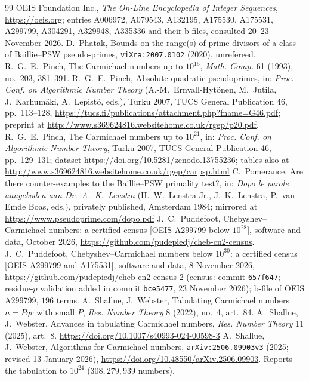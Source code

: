\documentclass[11pt]{amsart}
\theoremstyle{definition}
\theoremstyle{remark}
\begin{document}
\begin{thebibliography}{99}
 OEIS Foundation Inc., \emph{The On-Line Encyclopedia of Integer Sequences}, \url{https://oeis.org}; entries A006972, A079543, A132195, A175530, A175531, A299799, A304291, A329948, A335336 and their b-files, consulted 20--23 November 2026.
 D.~Phatak, Bounds on the range(s) of prime divisors of a class of Baillie--PSW pseudo-primes, \texttt{viXra:2007.0102} (2020), unrefereed.
 R.~G.~E.~Pinch, The Carmichael numbers up to $10^{15}$, \emph{Math. Comp.} 61 (1993), no.~203, 381--391.
 R.~G.~E.~Pinch, Absolute quadratic pseudoprimes, in: \emph{Proc. Conf. on Algorithmic Number Theory} (A.-M.~Ernvall-Hyt\"onen, M.~Jutila, J.~Karhum\"aki, A.~Lepist\"o, eds.), Turku 2007, TUCS General Publication 46, pp.~113--128, \url{https://tucs.fi/publications/attachment.php?fname=G46.pdf}; preprint at \url{http://www.s369624816.websitehome.co.uk/rgep/p20.pdf}.
 R.~G.~E.~Pinch, The Carmichael numbers up to $10^{21}$, in: \emph{Proc. Conf. on Algorithmic Number Theory}, Turku 2007, TUCS General Publication 46, pp.~129--131; dataset \url{https://doi.org/10.5281/zenodo.13755236}; tables also at \url{http://www.s369624816.websitehome.co.uk/rgep/carpsp.html}
 C.~Pomerance, Are there counter-examples to the Baillie--PSW primality test?, in: \emph{Dopo le parole aangeboden aan Dr.\ A.~K.~Lenstra} (H.~W.~Lenstra Jr., J.~K.~Lenstra, P.~van Emde Boas, eds.), privately published, Amsterdam 1984; mirrored at \url{https://www.pseudoprime.com/dopo.pdf}
 J.~C.~Puddefoot, Chebyshev--Carmichael numbers: a certified census [OEIS A299799 below $10^{28}$], software and data, October 2026, \url{https://github.com/pudepiedj/cheb-cn2-census}.
 J.~C.~Puddefoot, Chebyshev--Carmichael numbers below $10^{30}$: a certified census [OEIS A299799 and A175531], software and data, 8 November 2026, \url{https://github.com/pudepiedj/cheb-cn2-census-2} (census: commit \texttt{657f647}; residue-$p$ validation added in commit \texttt{bce5477}, 23 November 2026); b-file of OEIS A299799, $196$ terms.
 A.~Shallue, J.~Webster, Tabulating Carmichael numbers $n=Pqr$ with small $P$, \emph{Res. Number Theory} 8 (2022), no.~4, art.~84.
 A.~Shallue, J.~Webster, Advances in tabulating Carmichael numbers, \emph{Res. Number Theory} 11 (2025), art.~8. \url{https://doi.org/10.1007/s40993-024-00598-3}
 A.~Shallue, J.~Webster, Algorithms for Carmichael numbers, \texttt{arXiv:2506.09903v3} (2025; revised 13 January 2026), \url{https://doi.org/10.48550/arXiv.2506.09903}. Reports the tabulation to $10^{24}$ ($308{,}279{,}939$ numbers).

\end{thebibliography}
\end{document}
